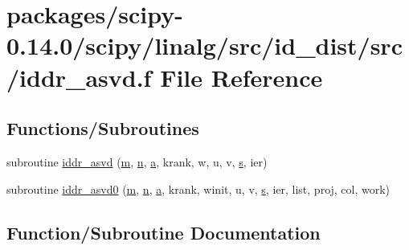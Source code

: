 \hypertarget{iddr__asvd_8f}{}\section{packages/scipy-\/0.14.0/scipy/linalg/src/id\+\_\+dist/src/iddr\+\_\+asvd.f File Reference}
\label{iddr__asvd_8f}
\subsection*{Functions/\+Subroutines}
\begin{DoxyCompactItemize}
\item 
subroutine \hyperlink{iddr__asvd_8f_a3a01ad098b2ca702a03be23f8156522b}{iddr\+\_\+asvd} (\hyperlink{indexexpr_8h_ab72fdb4031d47b75ab26dd18a437bcdc}{m}, \hyperlink{indexexpr_8h_ab427e2e2b4d6cec55fa088ea2a692ace}{n}, \hyperlink{gen__mat5files_8m_aae328bf20413f220e38aec4d95bfd6da}{a}, krank, w, u, v, \hyperlink{indexexpr_8h_ae024b0db549122b44c349ae28ec990dc}{s}, ier)
\item 
subroutine \hyperlink{iddr__asvd_8f_aa87e46e0543b72f58cb971f8392ca2e5}{iddr\+\_\+asvd0} (\hyperlink{indexexpr_8h_ab72fdb4031d47b75ab26dd18a437bcdc}{m}, \hyperlink{indexexpr_8h_ab427e2e2b4d6cec55fa088ea2a692ace}{n}, \hyperlink{gen__mat5files_8m_aae328bf20413f220e38aec4d95bfd6da}{a}, krank, winit, u, v, \hyperlink{indexexpr_8h_ae024b0db549122b44c349ae28ec990dc}{s}, ier, list, proj, col, work)
\end{DoxyCompactItemize}


\subsection{Function/\+Subroutine Documentation}
\hypertarget{iddr__asvd_8f_a3a01ad098b2ca702a03be23f8156522b}{}
